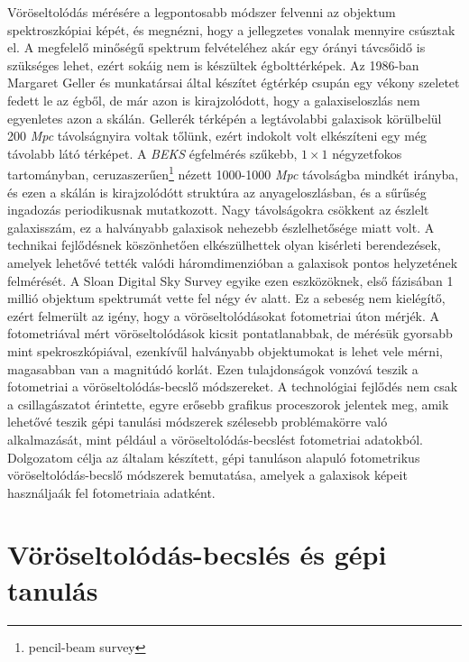 \documentclass[12pt,letterpaper,oneside,openright]{book}
\begin{document}
Vöröseltolódás mérésére a legpontosabb módszer felvenni az objektum spektroszkópiai képét, és megnézni, hogy a jellegzetes vonalak mennyire csúsztak el. A megfelelő minőségű spektrum felvételéhez akár egy órányi távcsőidő is szükséges lehet, ezért sokáig nem is készültek égbolttérképek. Az 1986-ban Margaret Geller és munkatársai által készítet égtérkép csupán egy vékony szeletet fedett le az égből, de már azon is kirajzolódott, hogy a galaxiseloszlás nem egyenletes azon a skálán. Gellerék térképén a legtávolabbi galaxisok körülbelül 200 \textit{Mpc} távolságnyira voltak tőlünk, ezért indokolt volt elkészíteni egy még távolabb látó térképet. A \textit{BEKS} égfelmérés szűkebb, $1\times 1$ négyzetfokos tartományban, ceruzaszerűen\footnote{pencil-beam survey} nézett 1000-1000 \textit{Mpc} távolságba mindkét irányba, és ezen a skálán is kirajzolódótt struktúra az anyageloszlásban, és a sűrűség ingadozás periodikusnak mutatkozott. Nagy távolságokra csökkent az észlelt galaxisszám, ez a halványabb galaxisok nehezebb észlelhetősége miatt volt. A technikai fejlődésnek köszönhetően elkészülhettek olyan kisérleti berendezések, amelyek lehetővé tették valódi háromdimenzióban a galaxisok pontos helyzetének felmérését. A Sloan Digital Sky Survey egyike ezen eszközöknek, első fázisában 1 millió objektum spektrumát vette fel négy év alatt\cite{fr}. Ez a sebeség nem kielégítő, ezért felmerült az igény, hogy a vöröseltolódásokat fotometriai úton mérjék. A fotometriával mért vöröseltolódások kicsit pontatlanabbak, de mérésük gyorsabb mint spekroszkópiával, ezenkívűl halványabb objektumokat is lehet vele mérni, magasabban van a magnitúdó korlát. Ezen tulajdonságok vonzóvá teszik a fotometriai a vöröseltolódás-becslő módszereket. A technológiai fejlődés nem csak a csillagászatot érintette, egyre erősebb grafikus proceszorok jelentek meg, amik lehetővé teszik gépi tanulási módszerek szélesebb problémakörre való alkalmazását, mint például a vöröseltolódás-becslést fotometriai adatokból.
\newline \indent
Dolgozatom célja az általam készített, gépi tanuláson alapuló fotometrikus vöröseltolódás-becslő módszerek bemutatása, amelyek a galaxisok képeit használjaák fel fotometriaia adatként. 


\chapter{Vöröseltolódás-becslés és gépi tanulás} %
\end{document}
